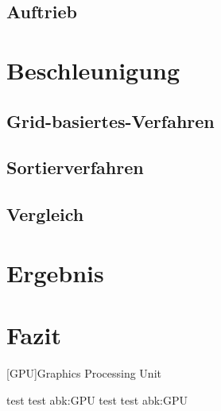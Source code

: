 \documentclass[intern,palatino]{cgBA}
\begin{document}
\subsection{Auftrieb}


\section{Beschleunigung}
\subsection{Grid-basiertes-Verfahren}
\subsection{Sortierverfahren}
\subsection{Vergleich}


\section{Ergebnis}


\section{Fazit}


\begin{acronym}
	[GPU]{Graphics Processing Unit}
\end{acronym}
test test \ac{abk:GPU} test test \acl{abk:GPU}

\cite{wiki:lol}

\end{document}
